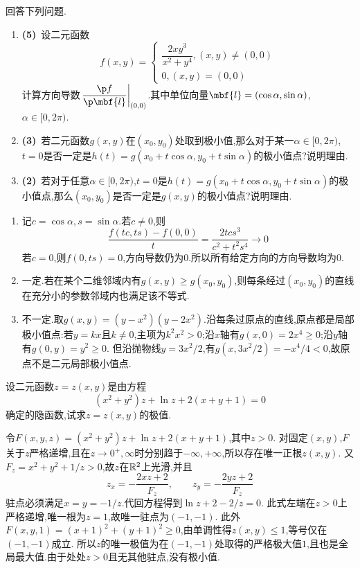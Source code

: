 \documentclass{ctexart}
\begin{document}
\begin{problem}[7.(10\songti{分})]
回答下列问题.
        \begin{enumerate}[label=\tbf{(\arabic*)}]
            \item \textbf{(5)}\ 设二元函数\[f(x,y)=\left\{\begin{array}{l}
                    \dfrac{2xy^3}{x^2+y^4},(x,y)\neq(0,0)\\
                    0,(x,y)=(0,0)
                \end{array}\right.\]计算方向导数$\left.\dfrac{\p f}{\p\mbf{l}}\right|_{(0,0)}$.其中单位向量$\mbf{l}=(\cos\alpha,\sin\alpha)$,$\alpha\in[0,2\pi)$.
            \item \textbf{(3)}\ 若二元函数$g(x,y)$在$(x_0,y_0)$处取到极小值,那么对于某一$\alpha\in[0,2\pi)$,$t=0$是否一定是$h(t)=g(x_0+t\cos\alpha,y_0+t\sin\alpha)$的极小值点?说明理由.
            \item \textbf{(2)}\ 若对于任意$\alpha\in[0,2\pi)$,$t=0$是$h(t)=g(x_0+t\cos\alpha,y_0+t\sin\alpha)$的极小值点,那么$(x_0,y_0)$是否一定是$g(x,y)$的极小值点?说明理由.
        \end{enumerate}
\end{problem}
\begin{solution}
\begin{enumerate}[label=\tbf{(\arabic*)},leftmargin=*]
\item 记$c=\cos\alpha,s=\sin\alpha$.若$c\neq0$,则
\[\dfrac{f(tc,ts)-f(0,0)}t=\dfrac{2tc s^3}{c^2+t^2s^4}\to0\]
若$c=0$,则$f(0,ts)=0$,方向导数仍为$0$.所以所有给定方向的方向导数均为$0$.
\item 一定.若在某个二维邻域内有$g(x,y)\geqslant g(x_0,y_0)$,则每条经过$(x_0,y_0)$的直线在充分小的参数邻域内也满足该不等式.
\item 不一定.取$g(x,y)=(y-x^2)(y-2x^2)$.沿每条过原点的直线,原点都是局部极小值点:若$y=kx$且$k\neq0$,主项为$k^2x^2>0$;沿$x$轴有$g(x,0)=2x^4\geqslant0$;沿$y$轴有$g(0,y)=y^2\geqslant0$.
但沿抛物线$y=3x^2/2$,有$g(x,3x^2/2)=-x^4/4<0$,故原点不是二元局部极小值点.
\end{enumerate}
\end{solution}
\begin{problem}[8.(15\songti{分})]
设二元函数$z=z(x,y)$是由方程
        \[(x^2+y^2)z+\ln z+2(x+y+1)=0\]确定的隐函数,试求$z=z(x,y)$的极值.
\end{problem}
\begin{solution}
令$F(x,y,z)=(x^2+y^2)z+\ln z+2(x+y+1)$,其中$z>0$.
对固定$(x,y)$,$F$关于$z$严格递增,且在$z\to0^+,\infty$时分别趋于$-\infty,+\infty$,所以存在唯一正根$z(x,y)$.
又$F_z=x^2+y^2+1/z>0$,故$z$在$\mathbb{R}^2$上光滑,并且
\[z_x=-\dfrac{2xz+2}{F_z},\qquad z_y=-\dfrac{2yz+2}{F_z}\]
驻点必须满足$x=y=-1/z$.代回方程得到$\ln z+2-2/z=0$.
此式左端在$z>0$上严格递增,唯一根为$z=1$,故唯一驻点为$(-1,-1)$.
此外$F(x,y,1)=(x+1)^2+(y+1)^2\geqslant0$,由单调性得$z(x,y)\leqslant1$,等号仅在$(-1,-1)$成立.
所以$z$的唯一极值为在$(-1,-1)$处取得的严格极大值$1$,且也是全局最大值.由于处处$z>0$且无其他驻点,没有极小值.
\end{solution}
\end{document}
